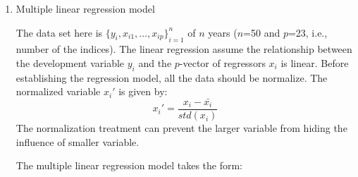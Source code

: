 \begin{enumerate}
\item{Multiple linear regression model}\par
The data set here is $\{{y_{i},x_{i1},\ldots ,x_{ip}\}}_{i=1}^{n}$ of $n$ years ($n$=50 and $p$=23, i.e., number of the indices). The linear regression assume the relationship between the development variable $y_i$ and the $p$-vector of regressors $x_i$ is linear.
Before establishing the regression model, all the data should be normalize. The normalized variable $x_{i}'$ is given by:
\begin{equation}
    x_{i}' = \frac{x_{i}-\bar{x_{i}}}{std(x_i)}
\end{equation}
The normalization treatment can prevent the larger variable from hiding the influence of smaller variable.

The multiple linear regression model takes the form:


\end{enumerate}

